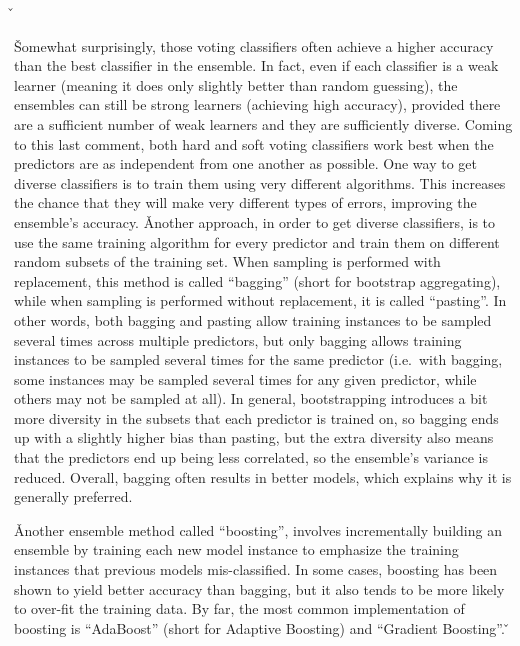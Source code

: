\v


\v

Somewhat surprisingly, those voting classifiers often achieve a higher accuracy than the best classifier in the
ensemble. In fact, even if each classifier is a weak learner (meaning it does only slightly better than random
guessing), the ensembles can still be strong learners (achieving high accuracy), provided there are a sufficient
number of weak learners and they are sufficiently diverse. Coming to this last comment, both hard and soft voting
classifiers work best when the predictors are as independent from one another as possible. One way to get diverse
classifiers is to train them using very different algorithms. This increases the chance that they will make very
different types of errors, improving the ensemble's accuracy. \v

Another approach, in order to get diverse classifiers, is to use the same training algorithm for every predictor and
train them on different random subsets of the training set. When sampling is performed with replacement, this method
is called ``bagging'' (short for bootstrap aggregating), while when sampling is performed without replacement, it is
called ``pasting''. In other words, both bagging and pasting allow training instances to be sampled several times
across multiple predictors, but only bagging allows training instances to be sampled several times for the same
predictor (i.e.\ with bagging, some instances may be sampled several times for any given predictor, while others may
not be sampled at all). In general, bootstrapping introduces a bit more diversity in the subsets that each predictor
is trained on, so bagging ends up with a slightly higher bias than pasting, but the extra diversity also means that
the predictors end up being less correlated, so the ensemble's variance is reduced. Overall, bagging often results in
better models, which explains why it is generally preferred.

\vspace{7pt}


\v

Another ensemble method called ``boosting'', involves incrementally building an ensemble by training each new model
instance to emphasize the training instances that previous models mis-classified. In some cases, boosting has been
shown to yield better accuracy than bagging, but it also tends to be more likely to over-fit the training data. By
far, the most common implementation of boosting is ``AdaBoost'' (short for Adaptive Boosting) and ``Gradient Boosting''.
\v

